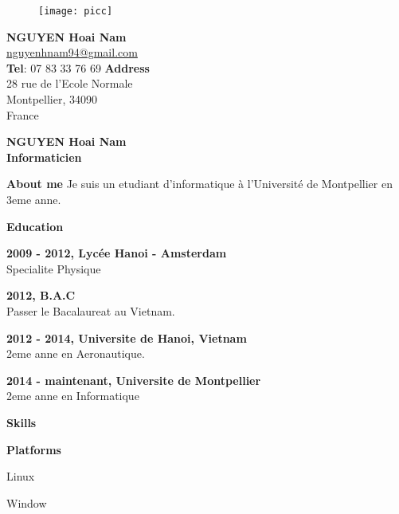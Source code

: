 \documentclass[a4paper,12pt,final]{memoir}
\newcommand{\Sep}{\vspace{1.5em}}
\newcommand{\SmallSep}{\vspace{0.5em}}
\newenvironment{AboutMe}
	{\ignorespaces\textbf{\color{RoyalBlue} About me}}
	{\Sep\ignorespacesafterend}
\newcommand{\CVSection}[1]
	{\Large\textbf{#1}\par
	\SmallSep\normalsize\normalfont}
\newcommand{\CVItem}[1]
	{\textbf{\color{RoyalBlue} #1}}
\begin{document}
\begin{figure}
	\hfill
	\texttt{[image: picc]}
	\vspace{-7cm}
\end{figure}

\begin{flushright}\small
  \textbf{NGUYEN Hoai Nam}\\
	\url{nguyenhnam94@gmail.com}  \\
    \textbf{Tel}: 07 83 33 76 69
    \textbf{Address} \\
28 rue de l'Ecole Normale \\ %
Montpellier, 34090 \\ %
France \\ %
\end{flushright}\normalsize
\framebreak


\Huge\bfseries {\color{RoyalBlue}  NGUYEN Hoai Nam} \\
\Large\bfseries  Informaticien \\

\normalsize\normalfont

\begin{AboutMe}
Je suis un etudiant d'informatique à l'Université de Montpellier en 3eme anne.
\end{AboutMe}

\Sep

\CVSection{Education}
\CVItem{2009 - 2012, Lycée Hanoi - Amsterdam}\\
 Specialite Physique
\SmallSep

\CVItem{2012, B.A.C}\\
Passer le Bacalaureat au Vietnam.
\SmallSep

\CVItem{2012 - 2014, Universite de Hanoi, Vietnam}\\
2eme anne en Aeronautique.

\CVItem{2014 - maintenant, Universite de Montpellier}\\
2eme anne en Informatique
\Sep

\CVSection{Skills}
\CVItem{Platforms}
\begin{multicols}{3}
\begin{compactitem}[\color{RoyalBlue}$\circ$]
	\item Linux 
	\item Window 
\end{compactitem}
\end{multicols}
\SmallSep
\end{document}
